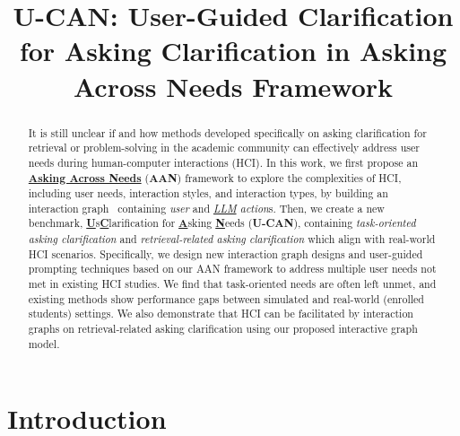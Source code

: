 \documentclass{article} %
\title{U-CAN: User-Guided Clarification for Asking Clarification in Asking Across Needs Framework}
\theoremstyle{definition}
\begin{document}
\maketitle


\begin{abstract}

    It is still unclear if and how methods developed specifically on asking clarification for retrieval or problem-solving in the academic community can effectively address user needs during human-computer interactions (HCI).
    In this work, we first propose an \underline{\textbf{Asking Across Needs}} (\textbf{AAN}) framework to explore the complexities of HCI, including user needs, interaction styles, and interaction types, by building an interaction graph~\citep{Pearl09a} containing \textit{user} and \textit{\underline{LLM} action}s.
    Then, we create a new benchmark, \textbf{\underline{U}}s\textbf{\underline{C}}larification for \textbf{\underline{A}}sking \textbf{\underline{N}}eeds (\textbf{U-CAN}), containing \textit{task-oriented asking clarification} and \textit{retrieval-related asking clarification} which align with real-world HCI scenarios.
    Specifically, we design new interaction graph designs and user-guided prompting techniques based on our AAN framework to address multiple user needs not met in existing HCI studies.
    We find that task-oriented needs are often left unmet, and existing methods show performance gaps between simulated and real-world (enrolled students) settings.
    We also demonstrate that HCI can be facilitated by interaction graphs on retrieval-related asking clarification using our proposed interactive graph model.
\end{abstract}

\section{Introduction}
\end{document}
